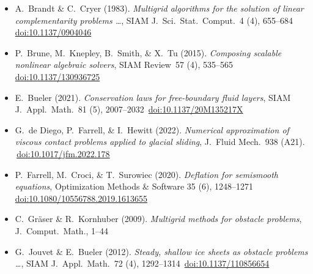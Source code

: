 
\newcommand{\sdoi}[1]{\,{\tiny \href{https://doi.org/#1}{doi:#1}}}
\begin{itemize}
\item A.~Brandt \& C.~Cryer (1983). \emph{Multigrid algorithms for the solution of linear complementarity problems \dots}, SIAM J.~Sci.~Stat.~Comput.~4 (4), 655--684 \sdoi{10.1137/0904046}
\item P.~Brune, M.~Knepley, B.~Smith, \& X.~Tu (2015). \emph{Composing scalable nonlinear algebraic solvers}, SIAM Review~57 (4), 535--565 \sdoi{10.1137/130936725}
\item E.~Bueler (2021). \emph{Conservation laws for free-boundary fluid layers}, SIAM J.~Appl.~Math.~81 (5), 2007--2032 \sdoi{10.1137/20M135217X}
\item G.~de Diego, P.~Farrell, \& I.~Hewitt (2022). \emph{Numerical approximation of viscous contact problems applied to glacial sliding}, J.~Fluid Mech.~938 (A21). \sdoi{10.1017/jfm.2022.178}
\item P.~Farrell, M.~Croci, \& T.~Surowiec (2020). \emph{Deflation for semismooth equations}, Optimization Methods \& Software 35 (6), 1248--1271 \sdoi{10.1080/10556788.2019.1613655}
\item C.~Gr{\"a}ser \& R.~Kornhuber (2009). \emph{Multigrid methods for obstacle problems}, J.~Comput.~Math., 1--44
\item G.~Jouvet \& E.~Bueler (2012). \emph{Steady, shallow ice sheets as obstacle problems \dots}, SIAM J.~Appl.~Math.~72 (4), 1292--1314 \sdoi{10.1137/110856654}

\end{itemize}
